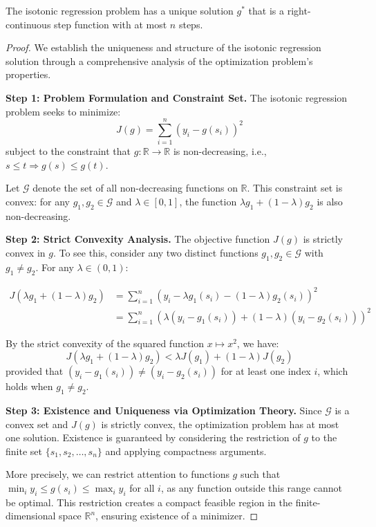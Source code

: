 \documentclass[10pt,a4paper]{amsart}
\begin{document}
\begin{theorem}
The isotonic regression problem has a unique solution $g^*$ that is a right-continuous step function with at most $n$ steps.
\end{theorem}

\begin{proof}
We establish the uniqueness and structure of the isotonic regression solution through a comprehensive analysis of the optimization problem's properties.

\textbf{Step 1: Problem Formulation and Constraint Set.}
The isotonic regression problem seeks to minimize:
$$J(g) = \sum_{i=1}^{n} (y_i - g(s_i))^2$$
subject to the constraint that $g: \mathbb{R} \rightarrow \mathbb{R}$ is non-decreasing, i.e., $s \leq t \Rightarrow g(s) \leq g(t)$.

Let $\mathcal{G}$ denote the set of all non-decreasing functions on $\mathbb{R}$. This constraint set is convex: for any $g_1, g_2 \in \mathcal{G}$ and $\lambda \in [0,1]$, the function $\lambda g_1 + (1-\lambda) g_2$ is also non-decreasing.

\textbf{Step 2: Strict Convexity Analysis.}
The objective function $J(g)$ is strictly convex in $g$. To see this, consider any two distinct functions $g_1, g_2 \in \mathcal{G}$ with $g_1 \neq g_2$. For any $\lambda \in (0,1)$:

\begin{align}
J(\lambda g_1 + (1-\lambda) g_2) &= \sum_{i=1}^{n} (y_i - \lambda g_1(s_i) - (1-\lambda) g_2(s_i))^2 \\
&= \sum_{i=1}^{n} (\lambda(y_i - g_1(s_i)) + (1-\lambda)(y_i - g_2(s_i)))^2
\end{align}

By the strict convexity of the squared function $x \mapsto x^2$, we have:
$$J(\lambda g_1 + (1-\lambda) g_2) < \lambda J(g_1) + (1-\lambda) J(g_2)$$
provided that $(y_i - g_1(s_i)) \neq (y_i - g_2(s_i))$ for at least one index $i$, which holds when $g_1 \neq g_2$.

\textbf{Step 3: Existence and Uniqueness via Optimization Theory.}
Since $\mathcal{G}$ is a convex set and $J(g)$ is strictly convex, the optimization problem has at most one solution. Existence is guaranteed by considering the restriction of $g$ to the finite set $\{s_1, s_2, \ldots, s_n\}$ and applying compactness arguments.

More precisely, we can restrict attention to functions $g$ such that $\min_i y_i \leq g(s_i) \leq \max_i y_i$ for all $i$, as any function outside this range cannot be optimal. This restriction creates a compact feasible region in the finite-dimensional space $\mathbb{R}^n$, ensuring existence of a minimizer.


\end{proof}
\end{document}
